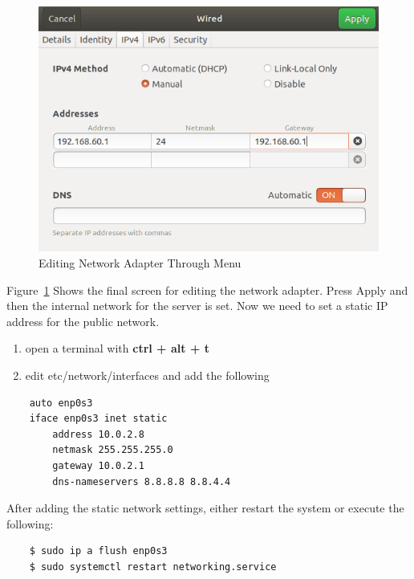 \documentclass[12pt]{article}
\begin{document}
    \begin{figure}[H]
        \begin{center}
            \includegraphics[scale=0.5]{setting_up_server_4.png}
        \end{center}{}
        \caption{Editing Network Adapter Through Menu}
        \label{fig:setting_up_server_4}
    \end{figure}

    Figure~\ref{fig:setting_up_server_4} Shows the final screen for editing the network adapter. Press Apply and then the internal network for the server is set. Now we need to set a static IP address for the public network.
    
    \begin{enumerate}
        \item open a terminal with \textbf{ctrl + alt + t}
        \item edit etc/network/interfaces and add the following
    \end{enumerate}
    
    \begin{verbatim}
    auto enp0s3
    iface enp0s3 inet static
        address 10.0.2.8
        netmask 255.255.255.0
        gateway 10.0.2.1
        dns-nameservers 8.8.8.8 8.8.4.4
    \end{verbatim}
    After adding the static network settings, either restart the system or execute the following:
    \begin{verbatim}
    $ sudo ip a flush enp0s3
    $ sudo systemctl restart networking.service
    \end{verbatim}
    
\end{document}
